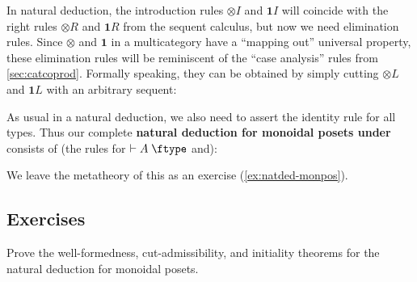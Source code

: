 \documentclass{book}
\let\types\vdash
\def\type{\;\ftype}
\def\one{\mathbf{1}}
\let\tensor\otimes
\def\tensorL{\mathord{\tensor}L}
\def\tensorR{\mathord{\tensor}R}
\def\tensorI{\mathord{\tensor}I}
\def\tensorE{\mathord{\tensor}E}
\begin{document}
In natural deduction, the introduction rules $\tensorI$ and $\one I$ will coincide with the right rules $\tensorR$ and $\one R$ from the sequent calculus, but now we need elimination rules.
Since $\tensor$ and $\one$ in a multicategory have a ``mapping out'' universal property, these elimination rules will be reminiscent of the ``case analysis'' rules from \cref{sec:catcoprod}.
Formally speaking, they can be obtained by simply cutting $\tensorL$ and $\one L$ with an arbitrary sequent:
As usual in a natural deduction, we also need to assert the identity rule for all types.
Thus our complete \textbf{natural deduction for monoidal posets under \cG} consists of (the rules for $\types A\type$ and):
We leave the metatheory of this as an exercise (\cref{ex:natded-monpos}).

\subsection*{Exercises}

\begin{ex}\label{ex:natded-monpos}
  Prove the well-formedness, cut-admissibility, and initiality theorems for the natural deduction for monoidal posets.
\end{ex}
\end{document}
